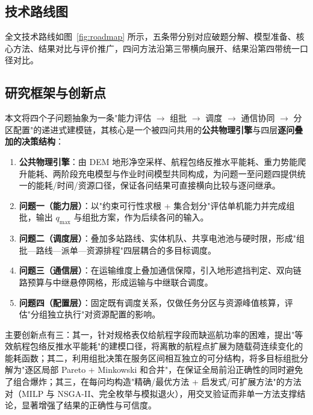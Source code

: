\subsection{技术路线图}

全文技术路线如图~\ref{fig:roadmap} 所示，五条带分别对应破题分解、模型准备、核心方法、结果对比与评价推广，四问方法沿第三带横向展开、结果沿第四带统一口径对比。

\subsection{研究框架与创新点}

本文将四个子问题抽象为一条"能力评估 $\to$ 组批 $\to$ 调度 $\to$ 通信协同 $\to$ 分区配置"的递进式建模链，其核心是一个被四问共用的\textbf{公共物理引擎}与四层\textbf{逐问叠加的决策结构}：

\begin{enumerate}
    \item \textbf{公共物理引擎}：由 DEM 地形净空采样、航程包络反推水平能耗、重力势能爬升能耗、两阶段充电模型与作业时间模型共同构成，为问题一至问题四提供统一的能耗/时间/资源口径，保证各问结果可直接横向比较与逐问继承。
    \item \textbf{问题一（能力层）}：以"约束可行性求根 + 集合划分"评估单机能力并完成组批，输出 $q_{\max}$ 与组批方案，作为后续各问的输入。
    \item \textbf{问题二（调度层）}：叠加多站路线、实体机队、共享电池池与硬时限，形成"组批—路线—派单—资源排程"四层耦合的多目标调度。
    \item \textbf{问题三（通信层）}：在运输维度上叠加通信保障，引入地形遮挡判定、双向链路预算与中继悬停网格，形成运输与中继联合调度。
    \item \textbf{问题四（配置层）}：固定既有调度关系，仅做任务分区与资源峰值核算，评估"分组独立执行"对资源配置的影响。
\end{enumerate}

主要创新点有三：其一，针对规格表仅给航程字段而缺巡航功率的困难，提出"等效航程包络反推水平能耗"的建模口径，将离散的航程点扩展为随载荷连续变化的能耗函数；其二，利用组批决策在服务区间相互独立的可分结构，将多目标组批分解为"逐区局部 Pareto + Minkowski 和合并"，在保证全局前沿正确性的同时避免了组合爆炸；其三，在每问均构造"精确/最优方法 + 启发式/可扩展方法"的方法对（MILP 与 NSGA-II、完全枚举与模拟退火），用交叉验证而非单一方法支撑结论，显著增强了结果的正确性与可信度。

